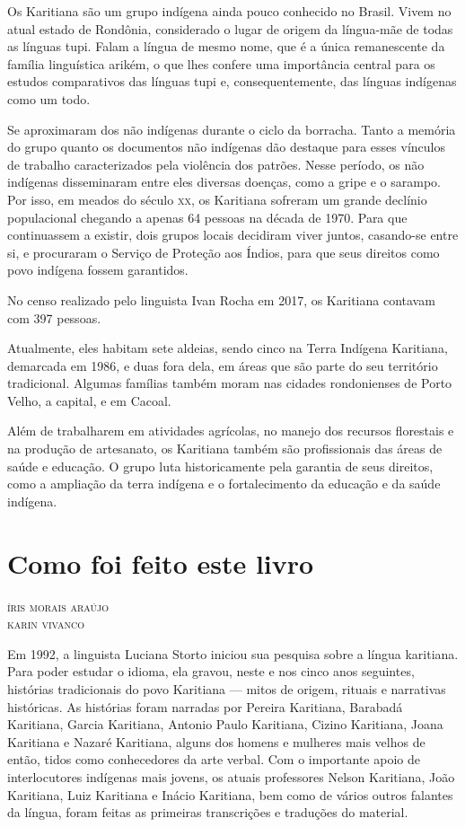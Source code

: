Os Karitiana são um grupo indígena ainda pouco conhecido no Brasil. Vivem no atual estado de Rondônia, considerado o lugar de origem da
língua-mãe de todas as línguas tupi. Falam a língua de
mesmo nome, que é a única remanescente da família linguística arikém, o
que lhes confere uma importância central para os estudos comparativos
das línguas tupi e, consequentemente, das línguas indígenas como um
todo.

Se aproximaram dos não indígenas durante o ciclo da
borracha. Tanto a memória do grupo quanto os documentos não indígenas dão
destaque para esses vínculos de trabalho caracterizados pela violência
dos patrões. Nesse período, os não indígenas disseminaram entre eles
diversas doenças, como a gripe e o sarampo. Por isso, em meados do
século \textsc{xx}, os Karitiana sofreram um grande declínio populacional 
chegando a apenas 64 pessoas na década de 1970. Para que continuassem a
existir, dois grupos locais decidiram viver juntos, casando-se entre si,
e procuraram o Serviço de Proteção aos Índios, para que seus direitos
como povo indígena fossem garantidos.

No censo realizado pelo linguista Ivan Rocha em 2017, os Karitiana
contavam com 397 pessoas.

Atualmente, eles habitam sete aldeias, sendo cinco na Terra Indígena
Karitiana, demarcada em 1986, e duas fora dela, em áreas que são parte
do seu território tradicional. Algumas famílias também moram nas cidades
rondonienses de Porto Velho, a capital, e em Cacoal.

Além de trabalharem em atividades agrícolas, no manejo dos recursos
florestais e na produção de artesanato, os Karitiana também são
profissionais das áreas de saúde e educação. O grupo luta historicamente
pela garantia de seus direitos, como a ampliação da terra indígena e o
fortalecimento da educação e da saúde indígena.

\chapter{Como foi feito este livro}

\begin{flushright}
\textsc{íris morais araújo}\\
\textsc{karin vivanco}
\end{flushright}

\noindent{}Em 1992, a linguista Luciana Storto
iniciou sua pesquisa sobre a língua karitiana. Para poder estudar o
idioma, ela gravou, neste e nos cinco anos seguintes, histórias
tradicionais do povo Karitiana --- mitos de origem, rituais e narrativas
históricas. As histórias foram narradas por Pereira Karitiana, Barabadá
Karitiana, Garcia Karitiana, Antonio Paulo Karitiana, Cizino Karitiana,
Joana Karitiana e Nazaré Karitiana, alguns dos homens e mulheres mais
velhos de então, tidos como conhecedores da arte verbal. Com o
importante apoio de interlocutores indígenas mais jovens, os atuais
professores Nelson Karitiana, João Karitiana, Luiz Karitiana e Inácio
Karitiana, bem como de vários outros falantes da língua, foram feitas as
primeiras transcrições e traduções do material.

